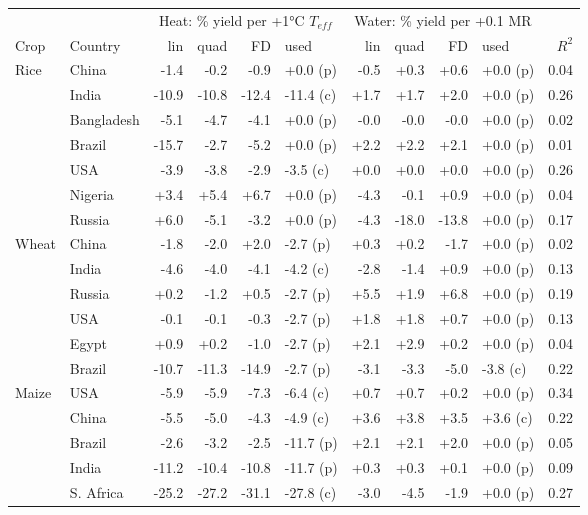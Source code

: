 \begin{tabular}{llrrrlrrrlr}
\toprule
 & & \multicolumn{4}{c}{Heat: \% yield per +1\si{\celsius} $T_{eff}$} & \multicolumn{4}{c}{Water: \% yield per +0.1 MR} & \\
\cmidrule(lr){3-6}\cmidrule(lr){7-10}
Crop & Country & lin & quad & FD & used & lin & quad & FD & used & $R^2$\\
\midrule
Rice & China & -1.4 & -0.2 & -0.9 & +0.0 (p) & -0.5 & +0.3 & +0.6 & +0.0 (p) & 0.04\\
 & India & -10.9 & -10.8 & -12.4 & -11.4 (c) & +1.7 & +1.7 & +2.0 & +0.0 (p) & 0.26\\
 & Bangladesh & -5.1 & -4.7 & -4.1 & +0.0 (p) & -0.0 & -0.0 & -0.0 & +0.0 (p) & 0.02\\
 & Brazil & -15.7 & -2.7 & -5.2 & +0.0 (p) & +2.2 & +2.2 & +2.1 & +0.0 (p) & 0.01\\
 & USA & -3.9 & -3.8 & -2.9 & -3.5 (c) & +0.0 & +0.0 & +0.0 & +0.0 (p) & 0.26\\
 & Nigeria & +3.4 & +5.4 & +6.7 & +0.0 (p) & -4.3 & -0.1 & +0.9 & +0.0 (p) & 0.04\\
 & Russia & +6.0 & -5.1 & -3.2 & +0.0 (p) & -4.3 & -18.0 & -13.8 & +0.0 (p) & 0.17\\
\midrule
Wheat & China & -1.8 & -2.0 & +2.0 & -2.7 (p) & +0.3 & +0.2 & -1.7 & +0.0 (p) & 0.02\\
 & India & -4.6 & -4.0 & -4.1 & -4.2 (c) & -2.8 & -1.4 & +0.9 & +0.0 (p) & 0.13\\
 & Russia & +0.2 & -1.2 & +0.5 & -2.7 (p) & +5.5 & +1.9 & +6.8 & +0.0 (p) & 0.19\\
 & USA & -0.1 & -0.1 & -0.3 & -2.7 (p) & +1.8 & +1.8 & +0.7 & +0.0 (p) & 0.13\\
 & Egypt & +0.9 & +0.2 & -1.0 & -2.7 (p) & +2.1 & +2.9 & +0.2 & +0.0 (p) & 0.04\\
 & Brazil & -10.7 & -11.3 & -14.9 & -2.7 (p) & -3.1 & -3.3 & -5.0 & -3.8 (c) & 0.22\\
\midrule
Maize & USA & -5.9 & -5.9 & -7.3 & -6.4 (c) & +0.7 & +0.7 & +0.2 & +0.0 (p) & 0.34\\
 & China & -5.5 & -5.0 & -4.3 & -4.9 (c) & +3.6 & +3.8 & +3.5 & +3.6 (c) & 0.22\\
 & Brazil & -2.6 & -3.2 & -2.5 & -11.7 (p) & +2.1 & +2.1 & +2.0 & +0.0 (p) & 0.05\\
 & India & -11.2 & -10.4 & -10.8 & -11.7 (p) & +0.3 & +0.3 & +0.1 & +0.0 (p) & 0.09\\
 & S. Africa & -25.2 & -27.2 & -31.1 & -27.8 (c) & -3.0 & -4.5 & -1.9 & +0.0 (p) & 0.27\\

\end{tabular}
